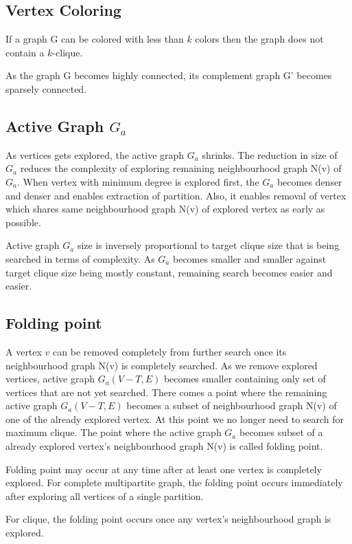 \documentclass[12pt]{article}
\theoremstyle{plain}
\theoremstyle{definition}
\begin{document}
\subsection{Vertex Coloring}
If a graph G can be colored with less than $k$ colors then the graph does not contain a $k$-clique.

As the graph G becomes highly connected, its complement graph G' becomes sparsely connected.


\subsection{Active Graph $G_a$}
As vertices gets explored, the active graph $G_a$ shrinks. The reduction in size of $G_a$ reduces the complexity of exploring remaining neighbourhood graph N(v) of $G_a$. When vertex with minimum degree is explored first, the $G_a$ becomes denser and denser and enables extraction of partition. Also, it enables removal of vertex which shares same neighbourhood graph N(v) of explored vertex as early as possible.

Active graph $G_a$ size is inversely proportional to target clique size that is being searched in terms of complexity. As $G_a$ becomes smaller and smaller against target clique size being mostly constant, remaining search becomes easier and easier.

\subsection{Folding point}
A vertex $v$ can be removed completely from further search once its neighbourhood graph N(v) is completely searched. As we remove explored vertices, active graph $G_a(V-T,E)$ becomes smaller containing only set of vertices that are not yet searched. There comes a point where the remaining active graph $G_a(V-T,E)$ becomes a subset of neighbourhood graph N(v) of one of the already explored vertex. At this point we no longer need to search for maximum clique. The point where the active graph $G_a$ becomes subset of a already explored vertex's neighbourhood graph N(v) is called folding point.

Folding point may occur at any time after at least one vertex is completely explored. For complete multipartite graph, the folding point occurs immediately after exploring all vertices of a single partition.

For clique, the folding point occurs once any vertex's neighbourhood graph is explored.
\end{document}
